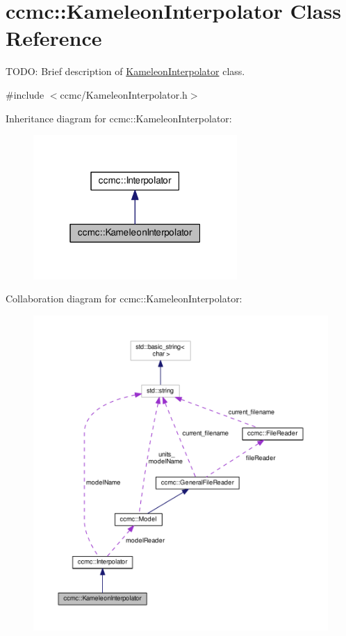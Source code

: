 \hypertarget{classccmc_1_1_kameleon_interpolator}{\section{ccmc\-:\-:Kameleon\-Interpolator Class Reference}
\label{classccmc_1_1_kameleon_interpolator}
}


T\-O\-D\-O\-: Brief description of \hyperlink{classccmc_1_1_kameleon_interpolator}{Kameleon\-Interpolator} class.  




{\ttfamily \#include $<$ccmc/\-Kameleon\-Interpolator.\-h$>$}



Inheritance diagram for ccmc\-:\-:Kameleon\-Interpolator\-:
\nopagebreak
\begin{figure}[H]
\begin{center}
\leavevmode
\includegraphics[width=220pt]{classccmc_1_1_kameleon_interpolator__inherit__graph}
\end{center}
\end{figure}


Collaboration diagram for ccmc\-:\-:Kameleon\-Interpolator\-:
\nopagebreak
\begin{figure}[H]
\begin{center}
\leavevmode
\includegraphics[width=350pt]{classccmc_1_1_kameleon_interpolator__coll__graph}
\end{center}
\end{figure}

